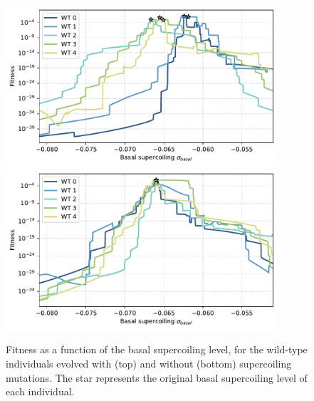 \begin{figure}
\centering
\includegraphics[width=0.9\textwidth]{epistasis/img/with-sc/fitness_landscapes_wt.pdf}
\includegraphics[width=0.9\textwidth]{epistasis/img/control/fitness_landscapes_wt.pdf}
\caption[Supercoiling fitness landscapes for the wild-type individuals evolved with and without supercoiling mutations]{Fitness as a function of the basal supercoiling level, for the wild-type individuals evolved with (top) and without (bottom) supercoiling mutations.
The star represents the original basal supercoiling level of each individual.}
\label{fig:epistasis:fitness-landscapes-wt}
\end{figure}

